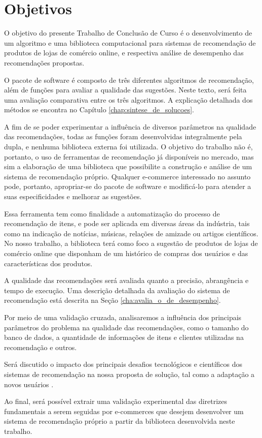\section[Objetivos]{Objetivos}
\label{chap:objetivos}

O objetivo do presente Trabalho de Conclusão de Curso é o desenvolvimento de um algoritmo e uma biblioteca computacional para sistemas de recomendação de produtos de lojas de comércio online, e respectiva análise de desempenho das recomendações propostas. 

O pacote de software é composto de três diferentes algoritmos de recomendação, além de funções para avaliar a qualidade das sugestões. Neste texto, será feita uma avaliação comparativa entre os três algoritmos. A explicação detalhada dos métodos se encontra no Capítulo \ref{chap:sintese_de_solucoes}.  

A fim de se poder experimentar a influência de diversos parâmetros na qualidade das recomendações, todas as funções foram desenvolvidas integralmente pela dupla, e nenhuma biblioteca externa foi utilizada. O objetivo do trabalho não é, portanto, o uso de ferramentas de recomendação já disponíveis no mercado, mas sim a elaboração de uma biblioteca que possibilite a construção e análise de um sistema de recomendação  próprio. Qualquer e-commerce interessado no assunto pode, portanto, apropriar-se do pacote de software e modificá-lo para atender a suas especificidades e melhorar as sugestões.

Essa ferramenta tem como finalidade a automatização do processo de recomendação de itens, e pode ser aplicada em diversas áreas da indústria, tais como na indicação de notícias, músicas, relações de amizade ou artigos científicos. No nosso trabalho, a biblioteca terá como foco a sugestão de produtos de lojas de comércio online que disponham de um histórico de compras dos usuários e das características dos produtos.

A qualidade das recomendações será avaliada quanto a precisão, abrangência e tempo de execução. Uma descrição detalhada da avaliação do sistema de recomendação está descrita na Seção \ref{cha:avalia_o_de_desempenho}.

Por meio de uma validação cruzada, analisaremos a influência dos principais parâmetros do problema na qualidade das recomendações, como o tamanho do banco de dados, a quantidade de informações de itens e clientes utilizadas na recomendação e outros.

Será discutido o impacto dos principais desafios tecnológicos e científicos dos sistemas de recomendação na nossa proposta de solução, tal como a adaptação a novos usuários \cite{sarwar2000analysis}.

Ao final, será possível extrair uma validação experimental das diretrizes fundamentais a serem seguidas por e-commerces que desejem desenvolver um sistema de recomendação próprio a partir da biblioteca desenvolvida neste trabalho. 